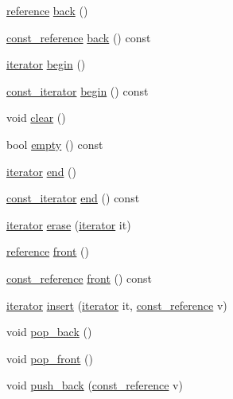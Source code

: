 \begin{DoxyCompactItemize}
\item 
\hyperlink{classmy__deque_a4c34c14f397b7676445b37c87003116b}{reference} \hyperlink{classmy__deque_a1d9aadb5bedc29da86d4323587cd5e4d}{back} ()
\item 
\hyperlink{classmy__deque_ad50d8b378580088cf77fa43f0640e49c}{const\-\_\-reference} \hyperlink{classmy__deque_ac273f9574a95af619b9f0dcc0d2e89d0}{back} () const 
\item 
\hyperlink{classmy__deque_1_1iterator}{iterator} \hyperlink{classmy__deque_aef8cac69d47cb1c274896b82ba8f453a}{begin} ()
\item 
\hyperlink{classmy__deque_1_1const__iterator}{const\-\_\-iterator} \hyperlink{classmy__deque_a8612539eff4ee446f85ffb30abf91a69}{begin} () const 
\item 
void \hyperlink{classmy__deque_aa29f90c63cde532f5fc169e8e66b514c}{clear} ()
\item 
bool \hyperlink{classmy__deque_a2b4f029c47afbdbf057639c5a6816d6c}{empty} () const 
\item 
\hyperlink{classmy__deque_1_1iterator}{iterator} \hyperlink{classmy__deque_a2576ee71790ebe55ac4200c506540bb5}{end} ()
\item 
\hyperlink{classmy__deque_1_1const__iterator}{const\-\_\-iterator} \hyperlink{classmy__deque_af465c3f8483634e4e656d90f8d0d88fb}{end} () const 
\item 
\hyperlink{classmy__deque_1_1iterator}{iterator} \hyperlink{classmy__deque_a08d9ba017ff4874a682d1cb58dd46cb7}{erase} (\hyperlink{classmy__deque_1_1iterator}{iterator} it)
\item 
\hyperlink{classmy__deque_a4c34c14f397b7676445b37c87003116b}{reference} \hyperlink{classmy__deque_a0eae28af0ffdd813d1f94f57d393fdf8}{front} ()
\item 
\hyperlink{classmy__deque_ad50d8b378580088cf77fa43f0640e49c}{const\-\_\-reference} \hyperlink{classmy__deque_a0f1239043b7339b8237a0c8bc663be6b}{front} () const 
\item 
\hyperlink{classmy__deque_1_1iterator}{iterator} \hyperlink{classmy__deque_ac5f2afdd6d7e93a456e9bbe24a01d1e1}{insert} (\hyperlink{classmy__deque_1_1iterator}{iterator} it, \hyperlink{classmy__deque_ad50d8b378580088cf77fa43f0640e49c}{const\-\_\-reference} v)
\item 
void \hyperlink{classmy__deque_a63cc9691ee90701693e948246311c498}{pop\-\_\-back} ()
\item 
void \hyperlink{classmy__deque_a85c322cdc4f629e44abdcf369fdd3dab}{pop\-\_\-front} ()
\item 
void \hyperlink{classmy__deque_a15867a8b57c321dcc8ebb4cfa785d7ca}{push\-\_\-back} (\hyperlink{classmy__deque_ad50d8b378580088cf77fa43f0640e49c}{const\-\_\-reference} v)

\end{DoxyCompactItemize}

